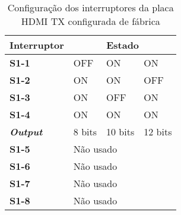 
\begin{table}[h!]
	\centering
	\begin{tabular}{@{}llll@{}}
		\toprule
		\multicolumn{1}{c}{\textbf{Interruptor}} & \multicolumn{3}{c}{\textbf{Estado}} \\ \midrule
		\multicolumn{1}{l|}{\textbf{S1-1}} & OFF & ON & ON \\
		\multicolumn{1}{l|}{\textbf{S1-2}} & ON & ON & OFF \\
		\multicolumn{1}{l|}{\textbf{S1-3}} & ON & OFF & ON \\
		\multicolumn{1}{l|}{\textbf{S1-4}} & ON & ON & ON \\
		\multicolumn{1}{l|}{\textbf{\textit{Output}}} & 8 bits & 10 bits & 12 bits \\
		\multicolumn{1}{l|}{\textbf{S1-5}} & \multicolumn{3}{l}{Não usado} \\
		\multicolumn{1}{l|}{\textbf{S1-6}} & \multicolumn{3}{l}{Não usado} \\
		\multicolumn{1}{l|}{\textbf{S1-7}} & \multicolumn{3}{l}{Não usado} \\
		\multicolumn{1}{l|}{\textbf{S1-8}} & \multicolumn{3}{l}{Não usado} \\ \bottomrule
	\end{tabular}
	\captionsetup{width=0.45\linewidth}
	\caption{Configuração dos interruptores da placa HDMI TX configurada de fábrica}
	\label{table:HDMI_default_switches_TX}
\end{table}


